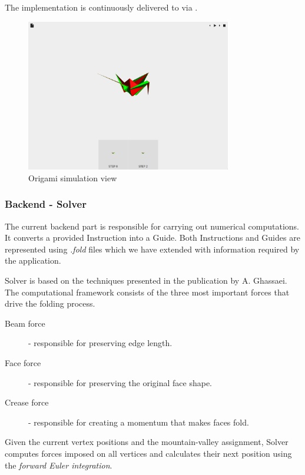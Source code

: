 The implementation is continuously delivered to  via .


\begin{figure}[h]
\caption{Origami simulation view}
  \centering
    \includegraphics[width=0.8\textwidth]{assets/prototype-front.png}
\end{figure}

\subsubsection{Backend - Solver}

The current backend part is responsible for carrying out numerical computations.
It converts a provided Instruction into a Guide.
Both Instructions and Guides are represented using \textit{.fold} files which we have extended with information required by the application.
\smallskip

Solver is based on the techniques presented in the publication by A. Ghassaei\cite{origami-simulator:paper}.
The computational framework consists of the three most important forces that drive the folding process.

\begin{description}
	\item[Beam force] - responsible for preserving edge length.
	\item[Face force] - responsible for preserving the original face shape.
	\item[Crease force] - responsible for creating a momentum that makes faces fold.
\end{description}

Given the current vertex positions and the mountain-valley assignment,
Solver computes forces imposed on all vertices and calculates their next position
using the \textit{forward Euler integration}.

